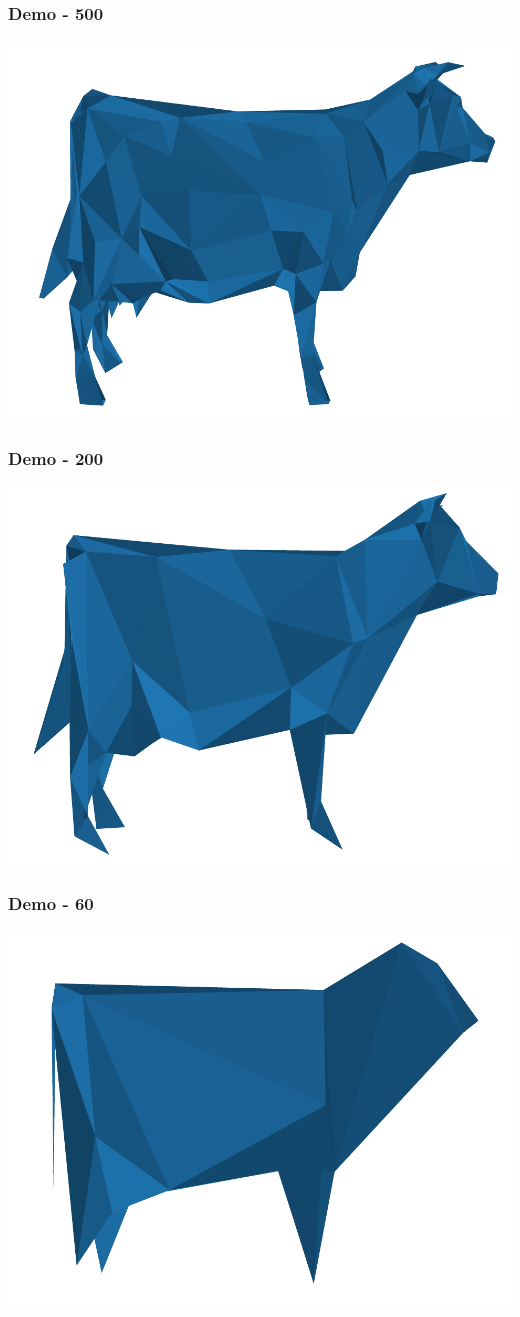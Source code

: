 \documentclass{beamer}
\begin{document}
\begin{frame}
\frametitle{Demo - 500}
\includegraphics[width=\textwidth]{img/krava500.pdf}
\end{frame}

\begin{frame}
\frametitle{Demo - 200}
\includegraphics[width=\textwidth]{img/krava200.pdf}
\end{frame}


\begin{frame}
\frametitle{Demo - 60}

\includegraphics[width=\textwidth]{img/krava60.pdf}
\end{frame}
\end{document}
